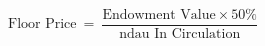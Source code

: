 \documentclass[10pt]{article}
\begin{document}
\[\text{Floor Price}\ =\ \frac{\text{Endowment Value} \times 50\%}{\text{ndau In Circulation}}\]
\end{document}
